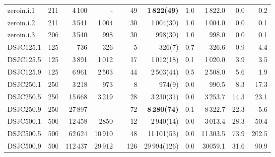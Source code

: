\documentclass{elsart}
\begin{document}
\begin{table}
\begin{scriptsize}
\begin{tabular}{lrrrcrrrrrr}
zeroin.i.1    & 211 & 4\,100   & -  &&49&  \textbf{1\,822(49)}  &1.0& 1\,822.0&0.0 & 0.2\\
zeroin.i.2    & 211 & 3\,541   &  1\,004 &&30&  1\,004(30)  &1.0& 1\,004.0&0.0 & 0.1\\
zeroin.i.3    & 206 & 3\,540  &  998 &&30&  998(30)  &1.0& 998.0&0.0 & 0.1  \\
\hline
DSJC125.1    & 125 & 736  & 326 &&5& 326(7)  &0.7& 326.6&0.9 & 4.4  \\
DSJC125.5    & 125 & 3\,891   & 1\,012  &&17& 1\,012(18)  &0.1& 1\,020.0&3.9 & 3.5 \\
DSJC125.9    & 125 & 6\,961   & 2\,503 &&44& 2\,503(44)  &0.5& 2\,508.0&5.6 & 1.9 \\
DSJC250.1    & 250 & 3\,218   & 973 &&8& 974(9)  &0.0& 990.5&8.3 & 17.3   \\
DSJC250.5    & 250 & 15\,668  &3\,219   &&28&3\,230(31)  &0.0& 3\,253.7&14.3 & 23.1 \\
DSJC250.9    &250 & 27\,897  &   &&72&  \textbf{8\,280(74)}  &0.1& 8\,322.7&22.3 & 5.6  \\

DSJC500.1    & 500 & 12\,458   & 2850 &&12& 2\,940(14)  &0.0& 3\,013.4& 28.3 & 50.4  \\
DSJC500.5    & 500 & 62\,624  &10\,910   &&48&11\,101(53)  &0.0& 11\,303.5 &73.9 & 202.5 \\
DSJC500.9    & 500 & 112\,437  &29\,912 &&126&  29\,994(126)  &0.0& 30059.1&31.6  & 90.9  \\


\end{tabular}
\end{scriptsize}
\end{table}
\end{document}

